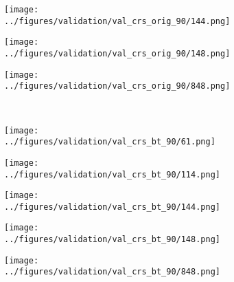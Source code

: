 \begin{figure}[h!]
\begin{subfigure}{0.18\textwidth}
		\label{fig:1}
	\end{subfigure}
	\begin{subfigure}{0.18\textwidth}
		\centering
		\texttt{[image: ../figures/validation/val\_crs\_orig\_90/144.png]}
		\label{fig:1}
	\end{subfigure}
	\begin{subfigure}{0.18\textwidth}
		\centering
		\texttt{[image: ../figures/validation/val\_crs\_orig\_90/148.png]}
		\label{fig:1}
	\end{subfigure}
	\begin{subfigure}{0.18\textwidth}
		\centering
		\texttt{[image: ../figures/validation/val\_crs\_orig\_90/848.png]}
		\label{fig:1}
	\end{subfigure}
	\vspace{-0.35cm}
	\\
		\begin{subfigure}[b]{0.03\textwidth} %
		\centering
	\end{subfigure}
	\hspace{0.05cm}
		\begin{subfigure}{0.18\textwidth}
		\centering
		\texttt{[image: ../figures/validation/val\_crs\_bt\_90/61.png]}
		\label{fig:1}
	\end{subfigure}
	\begin{subfigure}{0.18\textwidth}
		\centering
		\texttt{[image: ../figures/validation/val\_crs\_bt\_90/114.png]}
		\label{fig:1}
	\end{subfigure}
	\begin{subfigure}{0.18\textwidth}
		\centering
		\texttt{[image: ../figures/validation/val\_crs\_bt\_90/144.png]}
		\label{fig:1}
	\end{subfigure}
	\begin{subfigure}{0.18\textwidth}
		\centering
		\texttt{[image: ../figures/validation/val\_crs\_bt\_90/148.png]}
		\label{fig:1}
	\end{subfigure}
	\begin{subfigure}{0.18\textwidth}
		\centering
		\texttt{[image: ../figures/validation/val\_crs\_bt\_90/848.png]}
		\label{fig:1}
	\end{subfigure}
\vspace{0.5cm}
	\\
		\begin{subfigure}[b]{0.03\textwidth} %

\end{subfigure}
\end{figure}
